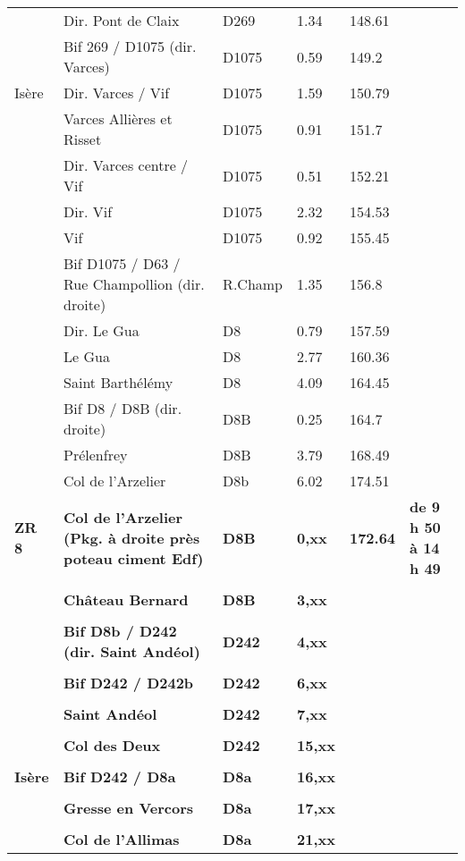 \documentclass{article}%
\begin{document}
\begin{longtable}{p{2.25cm}|p{7.0cm}|p{1.5cm}|p{1.5cm}|p{1.5cm}|p{3.5cm}}
 &Dir. Pont de Claix&D269&1.34&148.61& \\%
 &Bif 269 / D1075 (dir. Varces)&D1075&0.59&149.2& \\%
Isère&Dir. Varces / Vif&D1075&1.59&150.79& \\%
 &Varces Allières et Risset &D1075&0.91&151.7& \\%
 &Dir. Varces centre / Vif&D1075&0.51&152.21& \\%
 &Dir. Vif&D1075&2.32&154.53& \\%
 &Vif &D1075&0.92&155.45& \\%
 &Bif D1075 / D63 / Rue Champollion (dir. droite)&R.Champ&1.35&156.8& \\%
 &Dir. Le Gua&D8&0.79&157.59& \\%
 &Le Gua&D8&2.77&160.36& \\%
 &Saint Barthélémy&D8&4.09&164.45& \\%
 &Bif D8 / D8B (dir. droite)&D8B&0.25&164.7& \\%
 &Prélenfrey&D8B&3.79&168.49& \\%
 &Col de l'Arzelier&D8b&6.02&174.51& \\%
\textbf{ZR 8}&\textbf{Col de l'Arzelier (Pkg. à droite près poteau ciment Edf)}&\textbf{D8B}&\textbf{0,xx}&\textbf{172.64}&\textbf{de 9 h 50 à 14 h 49}\\%
 & & & & & \\%
 &\textbf{Château Bernard }&\textbf{D8B}&\textbf{3,xx}& & \\%
 & & & & & \\%
\textbf{ }&\textbf{Bif D8b / D242 (dir. Saint Andéol)}&\textbf{D242 }&\textbf{4,xx}& & \\%
 & & & & & \\%
 &\textbf{Bif D242 / D242b}&\textbf{D242 }&\textbf{6,xx}& & \\%
 & & & & & \\%
 &\textbf{Saint Andéol }&\textbf{D242 }&\textbf{7,xx}& & \\%
 & & & & & \\%
 &\textbf{Col des Deux}&\textbf{D242 }&\textbf{15,xx}& & \\%
 & & & & & \\%
\textbf{Isère}&\textbf{Bif D242 / D8a}&\textbf{D8a}&\textbf{16,xx}& & \\%
 & & & & & \\%
 &\textbf{Gresse en Vercors }&\textbf{D8a}&\textbf{17,xx}& & \\%
 & & & & & \\%
 &\textbf{Col de l'Allimas  }&\textbf{D8a}&\textbf{21,xx}& & \\%

\end{longtable}
\end{document}
